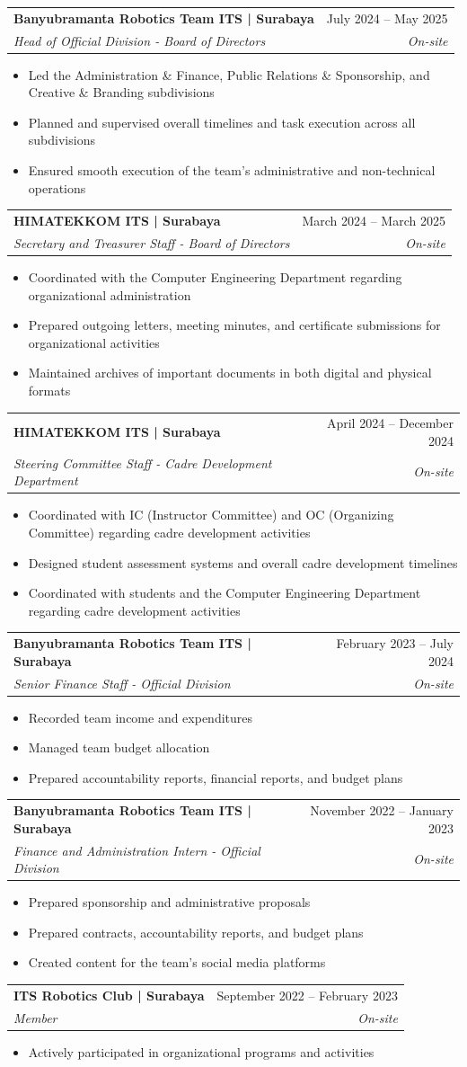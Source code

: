 \documentclass[letterpaper,11pt]{article}
\makeatletter
\newcommand{\resumeItem}[1]{
	\item\small{
		{#1 \vspace{-2pt}}
	}
}
\newcommand{\resumeSubheading}[4]{
	\vspace{-2pt}\item
	\begin{tabular*}{0.97\textwidth}[t]{l@{\extracolsep{\fill}}r}
		\textbf{#1} & #2 \\
		\textit{\small#3} & \textit{\small #4} \\
	\end{tabular*}\vspace{-7pt}
}
\newcommand{\resumeItemListStart}{\begin{itemize}}
\newcommand{\resumeItemListEnd}{\end{itemize}\vspace{-5pt}}
\makeatother
\begin{document}
	\resumeSubheading
	{Banyubramanta Robotics Team ITS | Surabaya}
	{July 2024 – May 2025}
	{Head of Official Division - Board of Directors}{On-site}
	\resumeItemListStart
	\resumeItem{Led the Administration \& Finance, Public Relations \& Sponsorship, and Creative \& Branding subdivisions}
	\resumeItem{Planned and supervised overall timelines and task execution across all subdivisions}
	\resumeItem{Ensured smooth execution of the team's administrative and non-technical operations}
	\resumeItemListEnd
	
	\resumeSubheading
	{HIMATEKKOM ITS | Surabaya}
	{March 2024 – March 2025}
	{Secretary and Treasurer Staff - Board of Directors}{On-site}
	\resumeItemListStart
	\resumeItem{Coordinated with the Computer Engineering Department regarding organizational administration}
	\resumeItem{Prepared outgoing letters, meeting minutes, and certificate submissions for organizational activities}
	\resumeItem{Maintained archives of important documents in both digital and physical formats}
	\resumeItemListEnd
	
	\resumeSubheading
	{HIMATEKKOM ITS | Surabaya}
	{April 2024 – December 2024}
	{Steering Committee Staff - Cadre Development Department}{On-site}
	\resumeItemListStart
	\resumeItem{Coordinated with IC (Instructor Committee) and OC (Organizing Committee) regarding cadre development activities}
	\resumeItem{Designed student assessment systems and overall cadre development timelines}
	\resumeItem{Coordinated with students and the Computer Engineering Department regarding cadre development activities}
	\resumeItemListEnd
	
	\resumeSubheading
	{Banyubramanta Robotics Team ITS | Surabaya}
	{February 2023 – July 2024}
	{Senior Finance Staff - Official Division}{On-site}
	\resumeItemListStart
	\resumeItem{Recorded team income and expenditures}
	\resumeItem{Managed team budget allocation}
	\resumeItem{Prepared accountability reports, financial reports, and budget plans}
	\resumeItemListEnd
	
	\resumeSubheading
	{Banyubramanta Robotics Team ITS | Surabaya}
	{November 2022 – January 2023}
	{Finance and Administration Intern - Official Division}{On-site}
	\resumeItemListStart
	\resumeItem{Prepared sponsorship and administrative proposals}
	\resumeItem{Prepared contracts, accountability reports, and budget plans}
	\resumeItem{Created content for the team's social media platforms}
	\resumeItemListEnd
	
	\resumeSubheading
	{ITS Robotics Club | Surabaya}
	{September 2022 – February 2023}
	{Member}{On-site}
	\resumeItemListStart
	\resumeItem{Actively participated in organizational programs and activities}
	\resumeItemListEnd
	
\end{document}
